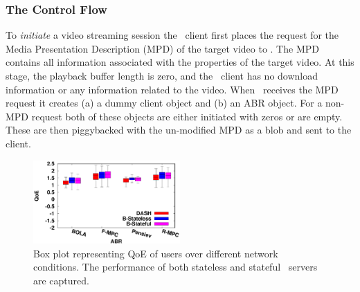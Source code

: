 \subsubsection{The Control Flow}
To \textit{initiate} a video streaming session the \bel\ client first places the request for the Media Presentation Description (MPD) of the target video to \servname. The MPD contains all information associated with the properties of the target video. At this stage, the playback buffer length is zero, and the \bel\ client has no download information or any information related to the video. When \servname\ receives the MPD request it creates (a) a dummy client object and (b) an \ac{ABR} object. For a non-MPD request both of these objects are either initiated with zeros or are empty. These are then piggybacked with the un-modified MPD as a blob and sent to the client.\\
\begin{figure}[h]
    \centering
    \includegraphics[width=0.5\textwidth]{images/qoeBox.eps}
    \caption{Box plot representing \ac{QoE} of users over different network conditions. The performance of both stateless and stateful \servname\ servers are captured.}
    \label{fig:chap05:result_qoe}
\end{figure}
